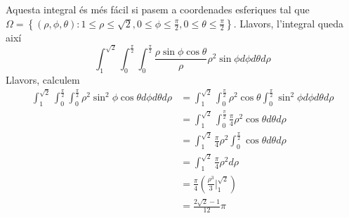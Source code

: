 \documentclass[a4paper, 12pt]{article}
\begin{document}
    \begin{solucio}
        Aquesta integral és més fácil si pasem a coordenades esferiques tal que $\Omega = \left\{\left(\rho, \phi, \theta\right): 1 \leq \rho \leq \sqrt{2}, 0 \leq \phi \leq \frac{\pi}{2}, 0 \leq \theta \leq \frac{\pi}{2}\right\}$.
        Llavors, l'integral queda així
        $$\int_{1}^{\sqrt{2}} \int_{0}^{\frac{\pi}{2}} \int_{0}^{\frac{\pi}{2}}  \frac{\rho\sin{\phi}\cos{\theta}}{\rho}\rho^2\sin{\phi} d\phi d\theta d\rho$$
        Llavors, calculem
        \begin{displaymath}
            \begin{split}
                \int_{1}^{\sqrt{2}} \int_{0}^{\frac{\pi}{2}} \int_{0}^{\frac{\pi}{2}}  \rho^2\sin^2{\phi}\cos{\theta} d\phi d\theta d\rho &= \int_{1}^{\sqrt{2}} \int_{0}^{\frac{\pi}{2}} \rho^2\cos{\theta} \int_{0}^{\frac{\pi}{2}} \sin^2{\phi} d\phi d\theta d\rho\\
                &= \int_{1}^{\sqrt{2}} \int_{0}^{\frac{\pi}{2}} \frac{\pi}{4} \rho^2\cos{\theta} d\theta d\rho\\
                &= \int_{1}^{\sqrt{2}} \frac{\pi}{4} \rho^2 \int_{0}^{\frac{\pi}{2}} \cos{\theta} d\theta d\rho\\
                &= \int_{1}^{\sqrt{2}} \frac{\pi}{4} \rho^2 d\rho\\
                &= \frac{\pi}{4} \left(\frac{\rho^3}{3}\bigg\rvert_{1}^{\sqrt{2}}\right)\\
                &= \frac{2\sqrt{2}-1}{12}\pi\\
            \end{split}
        \end{displaymath}
    \end{solucio}
\end{document}
